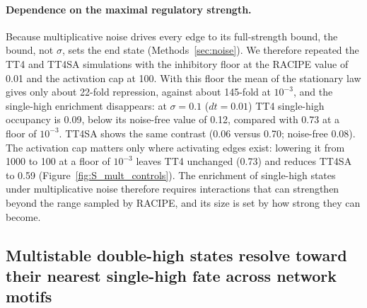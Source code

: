 \documentclass[11pt]{article}
\begin{document}
\paragraph{Dependence on the maximal regulatory strength.} \label{sec:mult_floor} Because multiplicative noise drives every edge to its full-strength bound, the bound, not $\sigma$, sets the end state (Methods~\ref{sec:noise}). We therefore repeated the TT4 and TT4SA simulations with the inhibitory floor at the RACIPE value of 0.01 and the activation cap at 100. With this floor the mean of the stationary law gives only about 22-fold repression, against about 145-fold at $10^{-3}$, and the single-high enrichment disappears: at $\sigma = 0.1$ ($dt = 0.01$) TT4 single-high occupancy is 0.09, below its noise-free value of 0.12, compared with 0.73 at a floor of $10^{-3}$. TT4SA shows the same contrast (0.06 versus 0.70; noise-free 0.08). The activation cap matters only where activating edges exist: lowering it from 1000 to 100 at a floor of $10^{-3}$ leaves TT4 unchanged (0.73) and reduces TT4SA to 0.59 (Figure~\ref{fig:S_mult_controls}). The enrichment of single-high states under multiplicative noise therefore requires interactions that can strengthen beyond the range sampled by RACIPE, and its size is set by how strong they can become.

\subsection{Multistable double-high states resolve toward their nearest single-high fate across network motifs}
\end{document}
